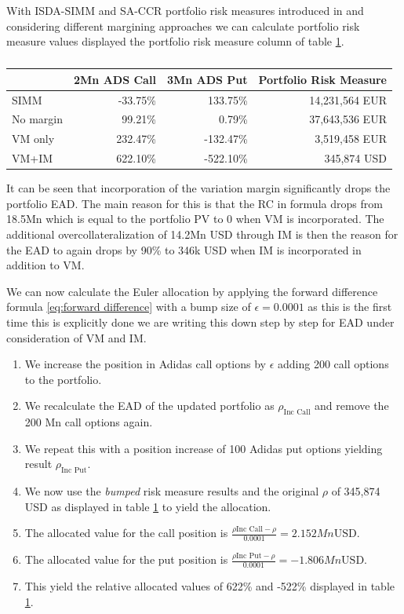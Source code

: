 \documentclass[../Thesis_AHoecherl.tex]{subfiles}
\begin{document}
    With ISDA-SIMM and SA-CCR portfolio risk measures introduced in  and considering different margining approaches we can calculate portfolio risk measure values displayed the portfolio risk measure column of table \ref{tab:2TradeEquityResults}.
    \begin{table}[htbp]
        \centering
        \begin{tabular}{l||r|r|r}
                & 2Mn ADS Call & 3Mn ADS Put & Portfolio Risk Measure\\
                \toprule
        SIMM  & -33.75\% & 133.75\% & 14,231,564 EUR \\
        No margin & 99.21\% & 0.79\% & 37,643,536 EUR \\
        VM only & 232.47\% & -132.47\% & 3,519,458 EUR \\
        VM+IM & 622.10\% & -522.10\% & 345,874 USD \\
        \end{tabular}%
        \caption{}
        \label{tab:2TradeEquityResults}%
    \end{table}%
    It can be seen that incorporation of the variation margin significantly drops the portfolio EAD. The main reason for this is that the RC in formula  drops from 18.5Mn which is equal to the portfolio PV to 0 when VM is incorporated.
    The additional overcollateralization of 14.2Mn USD through IM is then the reason for the EAD to again drops by 90\% to 346k USD when IM is incorporated in addition to VM.

    We can now calculate the Euler allocation by applying the forward difference formula \ref{eq:forward difference} with a bump size of $\epsilon = 0.0001$ as this is the first time this is explicitly done we are writing this down step by step for EAD under consideration of VM and IM.

    \begin{enumerate}
        \item We increase the position in Adidas call options by $\epsilon$ adding 200 call options to the portfolio.
        \item We recalculate the EAD of the updated portfolio as $\rho_{\text{Inc Call}}$ and remove the 200 Mn call options again.
        \item We repeat this with a position increase of 100 Adidas put options yielding result $\rho_{\text{Inc Put}}$.
        \item We now use the \emph{bumped} risk measure results and the original $\rho$ of 345,874 USD as displayed in table \ref{tab:2TradeEquityResults} to yield the allocation.
        \item The allocated value for the call position is $\frac{\rho{\text{Inc Call}-\rho}}{0.0001} = 2.152 Mn \text{USD}$.
        \item The allocated value for the put position is $\frac{\rho{\text{Inc Put}-\rho}}{0.0001} = -1.806 Mn \text{USD}$.
        \item This yield the relative allocated values of 622\% and -522\% displayed in table \ref{tab:2TradeEquityResults}.
    \end{enumerate}
\end{document}
